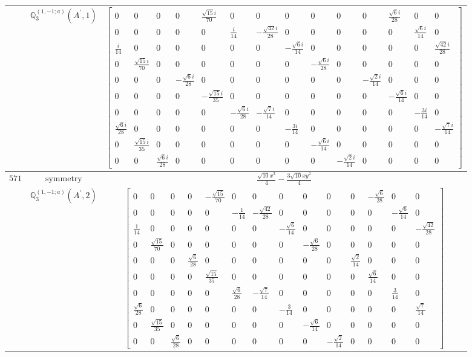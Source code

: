 \documentclass[fleqn,8pt,landscape]{jsarticle}
\begin{document}
\begin{longtable}{ccc}
$  $ & $ \mathbb{Q}_{3}^{(1,-1;a)}(A^{\prime},1) $ & $ \begin{bmatrix} 0 & 0 & 0 & 0 & \frac{\sqrt{15} i}{70} & 0 & 0 & 0 & 0 & 0 & 0 & \frac{\sqrt{6} i}{28} & 0 & 0 \\ 0 & 0 & 0 & 0 & 0 & \frac{i}{14} & - \frac{\sqrt{42} i}{28} & 0 & 0 & 0 & 0 & 0 & \frac{\sqrt{6} i}{14} & 0 \\ \frac{i}{14} & 0 & 0 & 0 & 0 & 0 & 0 & - \frac{\sqrt{6} i}{14} & 0 & 0 & 0 & 0 & 0 & \frac{\sqrt{42} i}{28} \\ 0 & \frac{\sqrt{15} i}{70} & 0 & 0 & 0 & 0 & 0 & 0 & - \frac{\sqrt{6} i}{28} & 0 & 0 & 0 & 0 & 0 \\ 0 & 0 & 0 & - \frac{\sqrt{6} i}{28} & 0 & 0 & 0 & 0 & 0 & 0 & - \frac{\sqrt{2} i}{14} & 0 & 0 & 0 \\ 0 & 0 & 0 & 0 & - \frac{\sqrt{15} i}{35} & 0 & 0 & 0 & 0 & 0 & 0 & - \frac{\sqrt{6} i}{14} & 0 & 0 \\ 0 & 0 & 0 & 0 & 0 & - \frac{\sqrt{6} i}{28} & - \frac{\sqrt{7} i}{14} & 0 & 0 & 0 & 0 & 0 & - \frac{3 i}{14} & 0 \\ \frac{\sqrt{6} i}{28} & 0 & 0 & 0 & 0 & 0 & 0 & - \frac{3 i}{14} & 0 & 0 & 0 & 0 & 0 & - \frac{\sqrt{7} i}{14} \\ 0 & \frac{\sqrt{15} i}{35} & 0 & 0 & 0 & 0 & 0 & 0 & - \frac{\sqrt{6} i}{14} & 0 & 0 & 0 & 0 & 0 \\ 0 & 0 & \frac{\sqrt{6} i}{28} & 0 & 0 & 0 & 0 & 0 & 0 & - \frac{\sqrt{2} i}{14} & 0 & 0 & 0 & 0 \end{bmatrix} $ \\ \hline
$ 571 $ & $ \text{symmetry} $ & $ \frac{\sqrt{10} x^{3}}{4} - \frac{3 \sqrt{10} x y^{2}}{4} $ \\
$  $ & $ \mathbb{Q}_{3}^{(1,-1;a)}(A^{\prime},2) $ & $ \begin{bmatrix} 0 & 0 & 0 & 0 & - \frac{\sqrt{15}}{70} & 0 & 0 & 0 & 0 & 0 & 0 & - \frac{\sqrt{6}}{28} & 0 & 0 \\ 0 & 0 & 0 & 0 & 0 & - \frac{1}{14} & - \frac{\sqrt{42}}{28} & 0 & 0 & 0 & 0 & 0 & - \frac{\sqrt{6}}{14} & 0 \\ \frac{1}{14} & 0 & 0 & 0 & 0 & 0 & 0 & - \frac{\sqrt{6}}{14} & 0 & 0 & 0 & 0 & 0 & - \frac{\sqrt{42}}{28} \\ 0 & \frac{\sqrt{15}}{70} & 0 & 0 & 0 & 0 & 0 & 0 & - \frac{\sqrt{6}}{28} & 0 & 0 & 0 & 0 & 0 \\ 0 & 0 & 0 & \frac{\sqrt{6}}{28} & 0 & 0 & 0 & 0 & 0 & 0 & \frac{\sqrt{2}}{14} & 0 & 0 & 0 \\ 0 & 0 & 0 & 0 & \frac{\sqrt{15}}{35} & 0 & 0 & 0 & 0 & 0 & 0 & \frac{\sqrt{6}}{14} & 0 & 0 \\ 0 & 0 & 0 & 0 & 0 & \frac{\sqrt{6}}{28} & - \frac{\sqrt{7}}{14} & 0 & 0 & 0 & 0 & 0 & \frac{3}{14} & 0 \\ \frac{\sqrt{6}}{28} & 0 & 0 & 0 & 0 & 0 & 0 & - \frac{3}{14} & 0 & 0 & 0 & 0 & 0 & \frac{\sqrt{7}}{14} \\ 0 & \frac{\sqrt{15}}{35} & 0 & 0 & 0 & 0 & 0 & 0 & - \frac{\sqrt{6}}{14} & 0 & 0 & 0 & 0 & 0 \\ 0 & 0 & \frac{\sqrt{6}}{28} & 0 & 0 & 0 & 0 & 0 & 0 & - \frac{\sqrt{2}}{14} & 0 & 0 & 0 & 0 \end{bmatrix} $ \\ \hline

\end{longtable}
\end{document}
